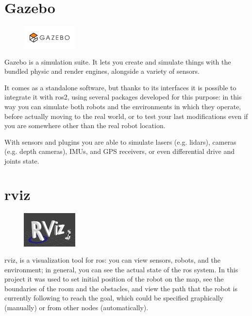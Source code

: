 \section{Gazebo}
\label{sec:gazebo}

\begin{figure}
    \includegraphics[width=0.25\textwidth]{images/gazebo}
\end{figure}

Gazebo is a simulation suite. It lets you create and simulate things with the bundled physic and render engines, alongside a variety of sensors.

It comes as a standalone software, but thanks to its interfaces it is possible to integrate it with \acrshort{ros}2, using several packages developed for this purpose: in this way you can simulate both robots and the environments in which they operate, before actually moving to the real world, or to test your last modifications even if you are somewhere other than the real robot location.

With sensors and plugins you are able to simulate lasers (e.g. lidars), cameras (e.g. depth cameras), IMUs, and GPS receivers, or even differential drive and joints state.

\section{\acrfull{rviz}}

\begin{figure}
    \includegraphics[width=0.25\textwidth]{images/rviz}
\end{figure}

\acrshort{rviz}, is a visualization tool for \acrshort{ros}: you can view sensors, robots, and the environment; in general, you can see the actual state of the \acrshort{ros} system. In this project it was used to set initial position of the robot on the map, see the boundaries of the room and the obstacles, and view the path that the robot is currently following to reach the goal, which could be specified graphically (manually) or from other nodes (automatically). 

